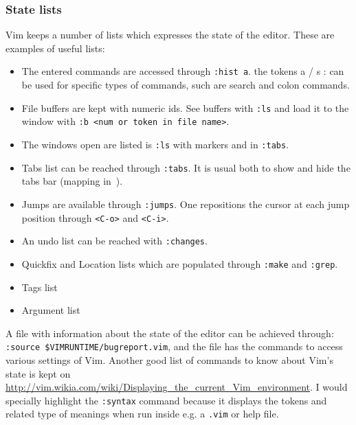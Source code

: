 \documentclass{article}
\newcommand{\ttt}[1] {
	\texttt{<#1>}}
\newcommand{\tttt}[1] {
	\texttt{#1}}
\begin{document}
\subsubsection{State lists}
Vim keeps a number of lists which expresses the state of the editor.
These are examples of useful lists:
\begin{itemize}
	\item The entered commands are accessed through \tttt{:hist a}. the tokens a / s : can be used for specific types of commands, such
		are search and colon commands.
	\item File buffers are kept with numeric ids. See buffers with \tttt{:ls} and load it to the window with \tttt{:b <num or token in file name>}.
	\item The windows open are listed is \tttt{:ls} with markers and in \tttt{:tabs}.
	\item Tabs list can be reached through \tttt{:tabs}.
		It is usual both to show and hide the tabs bar (mapping in~\cite{vimrc}).
	\item Jumps are available through \tttt{:jumps}.
		One repositions the cursor at each jump position through \ttt{C-o} and \ttt{C-i}.
	\item An undo list can be reached with \tttt{:changes}.
	\item Quickfix and Location lists which are populated through \tttt{:make} and \tttt{:grep}.

	\item Tags list
	\item Argument list
\end{itemize}

A file with information about the state of the editor
can be achieved through: \tttt{:source \$VIMRUNTIME/bugreport.vim},
and the file has the commands to access various settings of Vim.
Another good list of commands to know about Vim's state is kept on
\url{http://vim.wikia.com/wiki/Displaying_the_current_Vim_environment}.
I would specially highlight the \tttt{:syntax} command because
it displays the tokens and related type of meanings when run
inside e.g. a \tttt{.vim} or help file.
\end{document}
